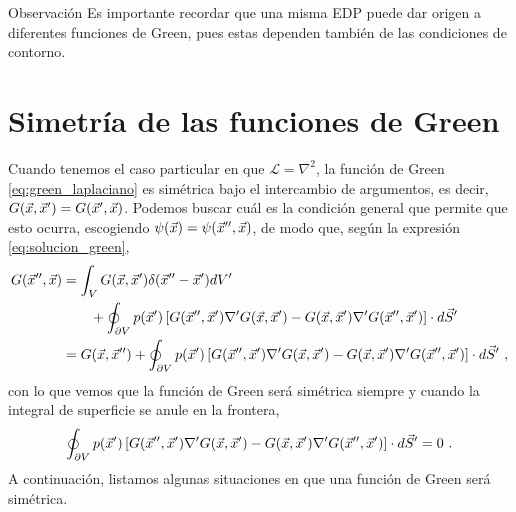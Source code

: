 

\begin{obs}{Observación}
    Es importante recordar que una misma EDP puede dar origen a diferentes funciones de Green, pues estas dependen también de las condiciones de contorno.
\end{obs}


\section{Simetría de las funciones de Green}

Cuando tenemos el caso particular en que $\mathcal{L} = \nabla^2$, la función de Green \eqref{eq:green_laplaciano} es simétrica bajo el intercambio de argumentos, es decir, $G(\vec{x}, \vec{x}') = G(\vec{x}', \vec{x})$. Podemos buscar cuál es la condición general que permite que esto ocurra, escogiendo $\psi(\vec{x}) = \psi(\vec{x}'', \vec{x})$, de modo que, según la expresión \eqref{eq:solucion_green},
\begin{align}
    \nonumber G(\vec{x}'', \vec{x}) & = \int_V G(\vec{x}, \vec{x}') \delta(\vec{x}'' - \vec{x}') dV' \\ 
    & \qquad + \oint_{\partial V} p(\vec{x}')\left[ G(\vec{x}'', \vec{x}') \nabla' G(\vec{x}, \vec{x}') - G(\vec{x}, \vec{x}') \nabla'G(\vec{x}'', \vec{x}') \right] \cdot d\vec{S}' \\
    & = G(\vec{x}, \vec{x}'') + \oint_{\partial V} p(\vec{x}')\left[ G(\vec{x}'', \vec{x}') \nabla' G(\vec{x}, \vec{x}') - G(\vec{x}, \vec{x}') \nabla'G(\vec{x}'', \vec{x}') \right] \cdot d\vec{S}' \ ,
\end{align}
con lo que vemos que la función de Green será simétrica siempre y cuando la integral de superficie se anule en la frontera, 
\begin{equation}\label{eq:condicion_simetria}
    \oint_{\partial V} p(\vec{x}')\left[ G(\vec{x}'', \vec{x}') \nabla' G(\vec{x}, \vec{x}') - G(\vec{x}, \vec{x}') \nabla'G(\vec{x}'', \vec{x}') \right] \cdot d\vec{S}' = 0 \ .
\end{equation}
A continuación, listamos algunas situaciones en que una función de Green será simétrica.

